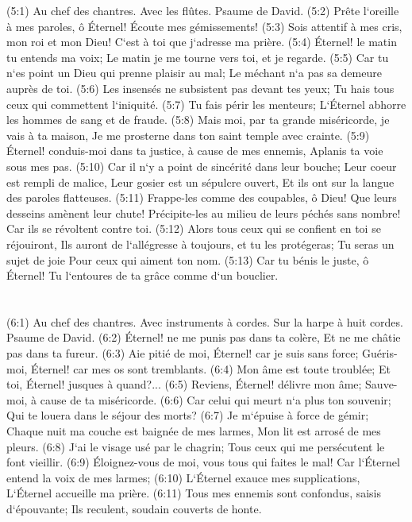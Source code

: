 \verse (5:1) Au chef des chantres. Avec les flûtes. Psaume de David. (5:2) Prête l`oreille à mes paroles, ô Éternel! Écoute mes gémissements! 
\verse (5:3) Sois attentif à mes cris, mon roi et mon Dieu! C`est à toi que j`adresse ma prière. 
\verse (5:4) Éternel! le matin tu entends ma voix; Le matin je me tourne vers toi, et je regarde. 
\verse (5:5) Car tu n`es point un Dieu qui prenne plaisir au mal; Le méchant n`a pas sa demeure auprès de toi. 
\verse (5:6) Les insensés ne subsistent pas devant tes yeux; Tu hais tous ceux qui commettent l`iniquité. 
\verse (5:7) Tu fais périr les menteurs; L`Éternel abhorre les hommes de sang et de fraude. 
\verse (5:8) Mais moi, par ta grande miséricorde, je vais à ta maison, Je me prosterne dans ton saint temple avec crainte. 
\verse (5:9) Éternel! conduis-moi dans ta justice, à cause de mes ennemis, Aplanis ta voie sous mes pas. 
\verse (5:10) Car il n`y a point de sincérité dans leur bouche; Leur coeur est rempli de malice, Leur gosier est un sépulcre ouvert, Et ils ont sur la langue des paroles flatteuses. 
\verse (5:11) Frappe-les comme des coupables, ô Dieu! Que leurs desseins amènent leur chute! Précipite-les au milieu de leurs péchés sans nombre! Car ils se révoltent contre toi. 
\verse (5:12) Alors tous ceux qui se confient en toi se réjouiront, Ils auront de l`allégresse à toujours, et tu les protégeras; Tu seras un sujet de joie Pour ceux qui aiment ton nom. 
\verse (5:13) Car tu bénis le juste, ô Éternel! Tu l`entoures de ta grâce comme d`un bouclier. 

\chapter{}

\verse (6:1) Au chef des chantres. Avec instruments à cordes. Sur la harpe à huit cordes. Psaume de David. (6:2) Éternel! ne me punis pas dans ta colère, Et ne me châtie pas dans ta fureur. 
\verse (6:3) Aie pitié de moi, Éternel! car je suis sans force; Guéris-moi, Éternel! car mes os sont tremblants. 
\verse (6:4) Mon âme est toute troublée; Et toi, Éternel! jusques à quand?... 
\verse (6:5) Reviens, Éternel! délivre mon âme; Sauve-moi, à cause de ta miséricorde. 
\verse (6:6) Car celui qui meurt n`a plus ton souvenir; Qui te louera dans le séjour des morts? 
\verse (6:7) Je m`épuise à force de gémir; Chaque nuit ma couche est baignée de mes larmes, Mon lit est arrosé de mes pleurs. 
\verse (6:8) J`ai le visage usé par le chagrin; Tous ceux qui me persécutent le font vieillir. 
\verse (6:9) Éloignez-vous de moi, vous tous qui faites le mal! Car l`Éternel entend la voix de mes larmes; 
\verse (6:10) L`Éternel exauce mes supplications, L`Éternel accueille ma prière. 
\verse (6:11) Tous mes ennemis sont confondus, saisis d`épouvante; Ils reculent, soudain couverts de honte. 

